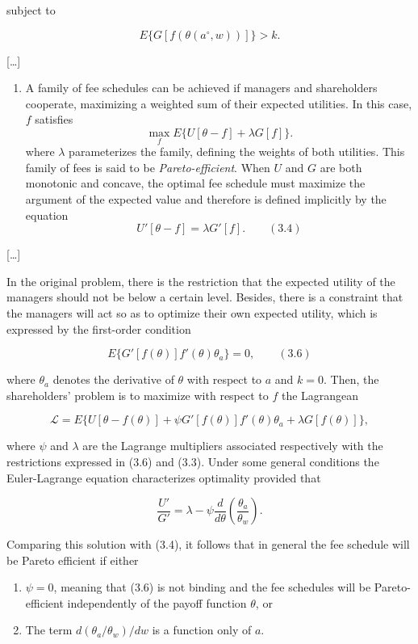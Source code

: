 \documentclass[11pt,a4paper]{article}
\providecommand{\tightlist}{\setlength{\itemsep}{0pt}\setlength{\parskip}{0pt}}
\begin{document}
subject to

\[E\{G[f(\theta(a^\circ, w))]\} > k.\]

{[}\ldots{]}

\begin{enumerate}
\def\labelenumi{\arabic{enumi}.}
\tightlist
\item
  A family of fee schedules can be achieved if managers and shareholders cooperate, maximizing a
  weighted sum of their expected utilities. In this case, \(f\) satisfies
  \[\max_f E\{U[\theta - f] + \lambda G[f]\}.\] where \(\lambda\) parameterizes the family, defining
  the weights of both utilities. This family of fees is said to be \emph{Pareto-efficient}. When
  \(U\) and \(G\) are both monotonic and concave, the optimal fee schedule must maximize the
  argument of the expected value and therefore is defined implicitly by the equation
  \[U'[\theta - f] = \lambda G'[f]. \qquad (3.4)\]
\end{enumerate}

{[}\ldots{]}

In the original problem, there is the restriction that the expected utility of the managers should
not be below a certain level. Besides, there is a constraint that the managers will act so as to
optimize their own expected utility, which is expressed by the first-order condition

\[E\{G'[f(\theta)]f'(\theta)\theta_a\} = 0, \qquad (3.6)\]

where \(\theta_a\) denotes the derivative of \(\theta\) with respect to \(a\) and \(k = 0\). Then,
the shareholders' problem is to maximize with respect to \(f\) the Lagrangean

\[\mathcal{L} = E\{U[\theta - f(\theta)] + \psi G'[f(\theta)]f'(\theta)\theta_a + \lambda G[f(\theta)]\},\]

where \(\psi\) and \(\lambda\) are the Lagrange multipliers associated respectively with the
restrictions expressed in (3.6) and (3.3). Under some general conditions the Euler-Lagrange equation
characterizes optimality provided that

\[\frac{U'}{G'} = \lambda - \psi\frac{d}{d\theta}\left(\frac{\theta_a}{\theta_w}\right).\]

Comparing this solution with (3.4), it follows that in general the fee schedule will be Pareto
efficient if either

\begin{enumerate}
\def\labelenumi{\arabic{enumi}.}
\tightlist
\item
  \(\psi = 0\), meaning that (3.6) is not binding and the fee schedules will be Pareto-efficient
  independently of the payoff function \(\theta\), or
\item
  The term \(d(\theta_a/\theta_w)/dw\) is a function only of \(a\).
\end{enumerate}
\end{document}
